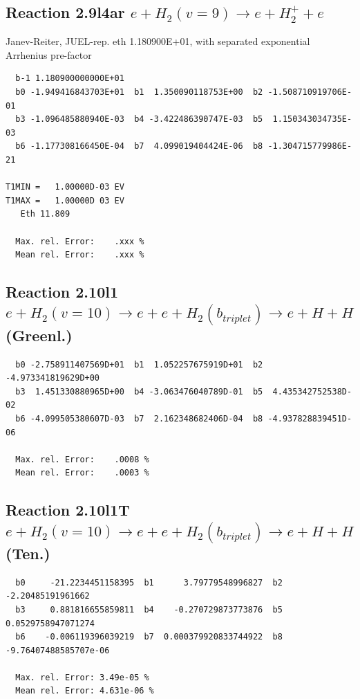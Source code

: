 \documentclass[12pt,dvipdfmx]{article}
\begin{document}
\subsection{
Reaction 2.9l4ar
 $ e + H_2(v=9) \rightarrow e + H_2^+  + e$
}
Janev-Reiter, JUEL-rep. eth 1.180900E+01,
with separated exponential Arrhenius pre-factor

\begin{small}\begin{verbatim}
  b-1 1.180900000000E+01
  b0 -1.949416843703E+01  b1  1.350090118753E+00  b2 -1.508710919706E-01
  b3 -1.096485880940E-03  b4 -3.422486390747E-03  b5  1.150343034735E-03
  b6 -1.177308166450E-04  b7  4.099019404424E-06  b8 -1.304715779986E-21

T1MIN =   1.00000D-03 EV
T1MAX =   1.00000D 03 EV
   Eth 11.809

  Max. rel. Error:    .xxx %
  Mean rel. Error:    .xxx %
\end{verbatim}\end{small}

\newpage
\subsection{
Reaction 2.10l1
$ e + H_2(v=10) \rightarrow e + e+ H_2(b_{triplet})\rightarrow e + H + H $ (Greenl.)
}


\begin{small}\begin{verbatim}
  b0 -2.758911407569D+01  b1  1.052257675919D+01  b2 -4.973341819629D+00
  b3  1.451330880965D+00  b4 -3.063476040789D-01  b5  4.435342752538D-02
  b6 -4.099505380607D-03  b7  2.162348682406D-04  b8 -4.937828839451D-06

  Max. rel. Error:    .0008 %
  Mean rel. Error:    .0003 %
\end{verbatim}\end{small}


\subsection{
Reaction 2.10l1T
$ e +  H_2(v=10) \rightarrow e + e+ H_2(b_{triplet})\rightarrow e + H + H $ (Ten.)
}


\begin{small}\begin{verbatim}
  b0     -21.2234451158395  b1      3.79779548996827  b2     -2.20485191961662
  b3     0.881816655859811  b4    -0.270729873773876  b5    0.0529758947071274
  b6    -0.006119396039219  b7  0.000379920833744922  b8 -9.76407488585707e-06

  Max. rel. Error: 3.49e-05 %
  Mean rel. Error: 4.631e-06 %
\end{verbatim}\end{small}
\end{document}
